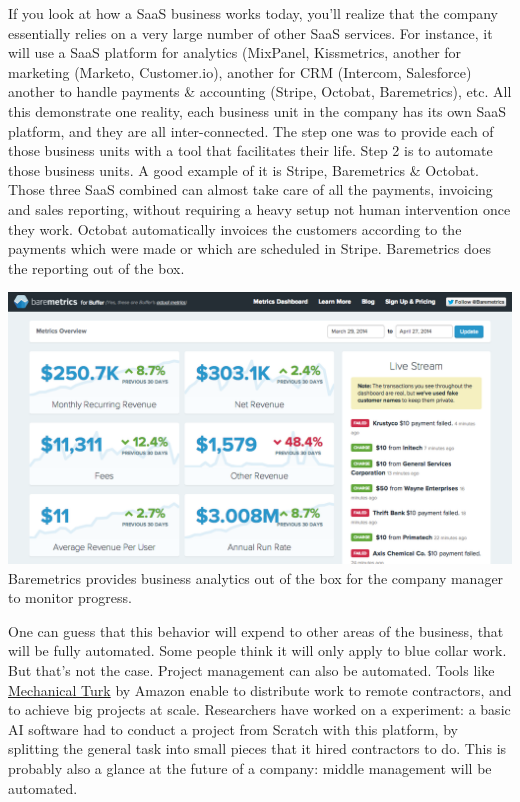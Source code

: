 \documentclass[12pt]{article}
\begin{document}
{If you look at how a SaaS business works today, you'll realize that the company
essentially relies on a very large number of other SaaS services. For instance,
it will use a SaaS platform for analytics (MixPanel, Kissmetrics, another for
marketing (Marketo, Customer.io), another for CRM (Intercom, Salesforce) another
to handle payments \& accounting (Stripe, Octobat, Baremetrics), etc.
All this demonstrate one reality, each business unit in the company has its own
SaaS platform, and they are all inter-connected. The step one was to provide
each of those business units with a tool that facilitates their life. Step 2 is
to automate those business units. A good example of it is Stripe, Baremetrics
\& Octobat. Those three SaaS combined can almost take care of all the payments,
invoicing and sales reporting, without requiring a heavy setup not human
intervention once they work. Octobat automatically invoices the customers
according to the payments which were made or which are scheduled in Stripe.
Baremetrics does the reporting out of the box.

\smallskip
\includegraphics[width=\textwidth]{baremetrics}
Baremetrics provides business analytics out of the box for the company manager
to monitor progress.

\smallskip

One can guess that this behavior will expend to other areas of the business,
that will be fully automated. Some people think it will only apply to blue
collar work. But that's not the case. Project management can also be automated.
Tools like \href{https://www.mturk.com/mturk/welcome}{Mechanical Turk} by Amazon
enable to distribute work to remote contractors, and to achieve big projects at
scale. Researchers have worked on a experiment: a basic AI software had to
conduct a project from Scratch with this platform, by splitting the general
task into small pieces that it hired contractors to do. This is probably also a
glance at the future of a company: middle management will be automated.


}
\end{document}
